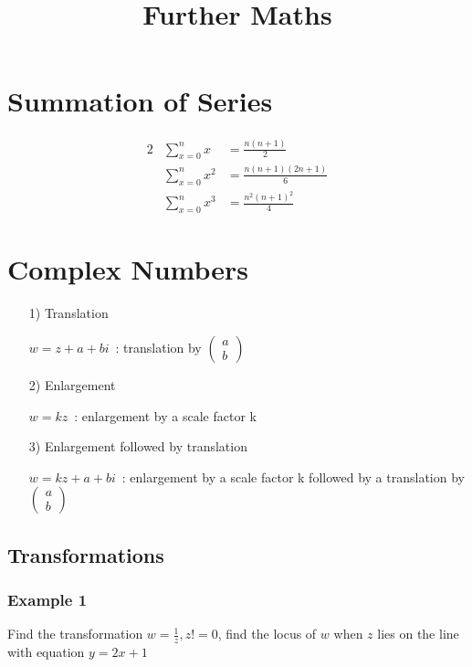 \documentclass[a4paper,9pt]{scrartcl}
\title{Further Maths}
\begin{document}
    \section{Summation of Series}\label{sec:summation-of-series}

    \begin{alignat*}{2}
        &\sum_{x=0}^{n}x    &= \frac{n(n+1)}{2} \\
        &\sum_{x=0}^{n}x^2  &= \frac{n(n+1)(2n+1)}{6} \\
        &\sum_{x=0}^{n}x^3  &= \frac{n^2(n+1)^2}{4}
    \end{alignat*}


    \section{Complex Numbers}\label{sec:complex-numbers}

    \begin{itemize}
        \item [1)] Translation

        $w=z+a+bi$\ : translation by
        $\begin{pmatrix}
             a \\b
        \end{pmatrix}$

        \item [2)] Enlargement

        $w=kz$\ : enlargement by a scale factor k

        \item [3)] Enlargement followed by translation

        $w=kz+a+bi$\ : enlargement by a scale factor k followed by a translation by
        $\begin{pmatrix}
             a \\b
        \end{pmatrix}$
    \end{itemize}

    \subsection{Transformations}

    \subsubsection{Example 1}
    Find the transformation $w = \frac{1}{z}, z != 0$, find the locus of $w$ when $z$ lies on the line with equation $y = 2x + 1$
\end{document}
